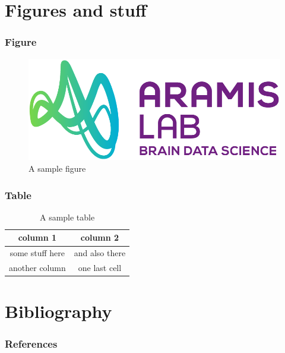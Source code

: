 \documentclass[
  11pt, %
  aspectratio=169, %
]{beamer}
\begin{document}
\section{Figures and stuff}

\begin{frame}
  \frametitle{Figure}

  \begin{figure}
    \includegraphics[height=.6\paperheight]{logos/logo_ARAMISLAB.png}
    \caption{A sample figure}
  \end{figure}

\end{frame}

\begin{frame}
  \frametitle{Table}

  \begin{table}
    \begin{tabular}{cc}
      \toprule
      column 1 & column 2\\
      \midrule
      some stuff here & and also there\\
      another column & one last cell\\
      \bottomrule
    \end{tabular}
    \caption{A sample table}
  \end{table}

\end{frame}

\section{Bibliography}

\begin{frame}
  \frametitle{References}

\end{frame}



\appendix
\end{document}

